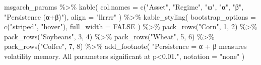 \documentclass[
  10pt,
  a4paper,
]{article}
\newenvironment{Shaded}{\begin{snugshade}}{\end{snugshade}}
\newcommand{\AttributeTok}[1]{\textcolor[rgb]{0.40,0.45,0.13}{#1}}
\newcommand{\ConstantTok}[1]{\textcolor[rgb]{0.56,0.35,0.01}{#1}}
\newcommand{\DecValTok}[1]{\textcolor[rgb]{0.68,0.00,0.00}{#1}}
\newcommand{\FunctionTok}[1]{\textcolor[rgb]{0.28,0.35,0.67}{#1}}
\newcommand{\NormalTok}[1]{\textcolor[rgb]{0.00,0.23,0.31}{#1}}
\newcommand{\SpecialCharTok}[1]{\textcolor[rgb]{0.37,0.37,0.37}{#1}}
\newcommand{\StringTok}[1]{\textcolor[rgb]{0.13,0.47,0.30}{#1}}
\begin{document}
\begin{Shaded}
\begin{Highlighting}[]
\NormalTok{msgarch\_params }\SpecialCharTok{\%\textgreater{}\%}
  \FunctionTok{kable}\NormalTok{(}
    \AttributeTok{col.names =} \FunctionTok{c}\NormalTok{(}\StringTok{"Asset"}\NormalTok{, }\StringTok{"Regime"}\NormalTok{, }\StringTok{"ω"}\NormalTok{, }\StringTok{"α"}\NormalTok{, }\StringTok{"β"}\NormalTok{, }\StringTok{"Persistence (α+β)"}\NormalTok{),}
    \AttributeTok{align =} \StringTok{"llrrrr"}
\NormalTok{  ) }\SpecialCharTok{\%\textgreater{}\%}
  \FunctionTok{kable\_styling}\NormalTok{(}
    \AttributeTok{bootstrap\_options =} \FunctionTok{c}\NormalTok{(}\StringTok{"striped"}\NormalTok{, }\StringTok{"hover"}\NormalTok{),}
    \AttributeTok{full\_width =} \ConstantTok{FALSE}
\NormalTok{  ) }\SpecialCharTok{\%\textgreater{}\%}
  \FunctionTok{pack\_rows}\NormalTok{(}\StringTok{"Corn"}\NormalTok{, }\DecValTok{1}\NormalTok{, }\DecValTok{2}\NormalTok{) }\SpecialCharTok{\%\textgreater{}\%}
  \FunctionTok{pack\_rows}\NormalTok{(}\StringTok{"Soybeans"}\NormalTok{, }\DecValTok{3}\NormalTok{, }\DecValTok{4}\NormalTok{) }\SpecialCharTok{\%\textgreater{}\%}
  \FunctionTok{pack\_rows}\NormalTok{(}\StringTok{"Wheat"}\NormalTok{, }\DecValTok{5}\NormalTok{, }\DecValTok{6}\NormalTok{) }\SpecialCharTok{\%\textgreater{}\%}
  \FunctionTok{pack\_rows}\NormalTok{(}\StringTok{"Coffee"}\NormalTok{, }\DecValTok{7}\NormalTok{, }\DecValTok{8}\NormalTok{) }\SpecialCharTok{\%\textgreater{}\%}
  \FunctionTok{add\_footnote}\NormalTok{(}
    \StringTok{"Persistence = α + β measures volatility memory. All parameters significant at p\textless{}0.01."}\NormalTok{,}
    \AttributeTok{notation =} \StringTok{"none"}
\NormalTok{  )}
\end{Highlighting}
\end{Shaded}
\end{document}
